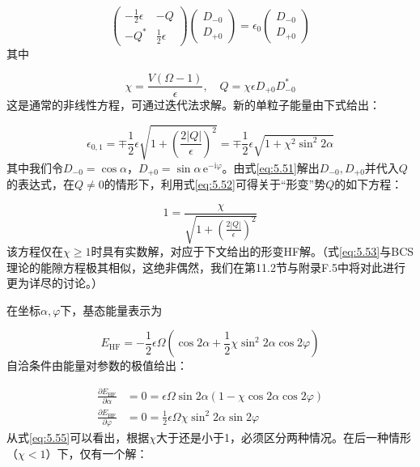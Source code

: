 \begin{equation}
\begin{pmatrix}-\frac{1}{2}\epsilon & -Q\\
-Q^{*} & \frac{1}{2}\epsilon
\end{pmatrix}\begin{pmatrix}D_{-0}\\
D_{+0}
\end{pmatrix}=\epsilon_{0}\begin{pmatrix}D_{-0}\\
D_{+0}
\end{pmatrix}\label{eq:5.51}
\end{equation}
其中

\begin{equation}
\chi=\frac{V(\Omega-1)}{\epsilon},\quad Q=\chi\epsilon D_{+0}D^{*}_{-0}
\end{equation}
这是通常的非线性方程，可通过迭代法求解。新的单粒子能量由下式给出：

\begin{equation}
\epsilon_{0,1}=\mp\frac{1}{2}\epsilon\sqrt{1+\left(\frac{2|Q|}{\epsilon}\right)^{2}}=\mp\frac{1}{2}\epsilon\sqrt{1+\chi^{2}\sin^{2}2\alpha}\label{eq:5.52}
\end{equation}
其中我们令$D_{-0}=\cos\alpha$，$D_{+0}=\sin\alpha\,\mathrm{e}^{-\mathrm{i}\varphi}$。由式\ref{eq:5.51}解出$D_{-0},D_{+0}$并代入$Q$的表达式，在$Q\neq0$的情形下，利用式\ref{eq:5.52}可得关于“形变”势$Q$的如下方程：

\begin{equation}
1=\frac{\chi}{\sqrt{1+\left(\frac{2|Q|}{\epsilon}\right)^{2}}}\label{eq:5.53}
\end{equation}
该方程仅在$\chi\ge1$时具有实数解，对应于下文给出的形变HF解。（式\ref{eq:5.53}与BCS理论的能隙方程极其相似，这绝非偶然，我们在第11.2节与附录F.5中将对此进行更为详尽的讨论。）

在坐标$\alpha,\varphi$下，基态能量表示为

\begin{equation}
E_{\mathrm{HF}}=-\frac{1}{2}\epsilon\Omega\left(\cos2\alpha+\frac{1}{2}\chi\sin^{2}2\alpha\cos2\varphi\right)\label{eq:5.54}
\end{equation}
自洽条件由能量对参数的极值给出：

\begin{align}
\frac{\partial E_{\mathrm{HF}}}{\partial\alpha} & =0=\epsilon\Omega\sin2\alpha\left(1-\chi\cos2\alpha\cos2\varphi\right)\label{eq:5.55}\\
\frac{\partial E_{\mathrm{HF}}}{\partial\varphi} & =0=\frac{1}{2}\epsilon\Omega\chi\sin^{2}2\alpha\sin2\varphi\nonumber 
\end{align}
从式\ref{eq:5.55}可以看出，根据$\chi$大于还是小于1，必须区分两种情况。在后一种情形（$\chi<1$）下，仅有一个解：

